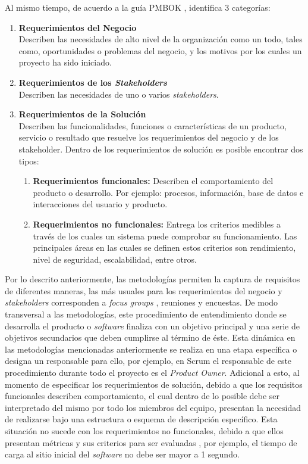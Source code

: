 Al mismo tiempo, de acuerdo a la guía PMBOK \cite{pmbok_guide}, identifica 3 categorías:

\begin{enumerate}
  \item \textbf{Requerimientos del Negocio}\mbox{}\\ Describen las necesidades de alto nivel de la organización como un todo, tales como, oportunidades o problemas del negocio, y los motivos por los cuales un proyecto ha sido iniciado.
  \item \textbf{Requerimientos de los \textit{Stakeholders}}\mbox{}\\ Describen las necesidades de uno o varios \textit{stakeholders}.
  \item \textbf{Requerimientos de la Solución} \mbox{} \\ Describen las funcionalidades, funciones o características de un producto, servicio o resultado que resuelve los requerimientos del negocio y de los stakeholder. Dentro de los requerimientos de solución es posible encontrar dos tipos:
    \begin{enumerate}
      \item \textbf{Requerimientos funcionales:} Describen el comportamiento del producto o desarrollo. Por ejemplo: procesos, información, base de datos e interacciones del usuario y producto.
      \item \textbf{Requerimientos no funcionales:} Entrega los criterios medibles a través de los cuales un sistema puede comprobar su funcionamiento. Las principales áreas en las cuales se definen estos criterios son rendimiento, nivel de seguridad, escalabilidad, entre otros.
    \end{enumerate}
\end{enumerate}

Por lo descrito anteriormente, las metodologías permiten la captura de requisitos de diferentes maneras, las más usuales para los requerimientos del negocio y \textit{stakeholders} corresponden a \textit{focus groups} , reuniones y encuestas. De modo transversal a las metodologías, este procedimiento de entendimiento donde se desarrolla el producto o \textit{software} finaliza con un objetivo principal y una serie de objetivos secundarios que deben cumplirse al término de éste. Esta dinámica en las metodologías mencionadas anteriormente se realiza en una etapa específica o designa un responsable para ello, por ejemplo, en Scrum el responsable de este procedimiento durante todo el proyecto es el \textit{Product Owner}. Adicional a esto, al momento de especificar los requerimientos de solución, debido a que los requisitos funcionales describen comportamiento, el cual dentro de lo posible debe ser interpretado del mismo por todo los miembros del equipo, presentan la necesidad de realizarse bajo una estructura o esquema de descripción específico. Esta situación no sucede con los requerimientos no funcionales, debido a que ellos presentan métricas  y sus criterios para ser evaluadas , por ejemplo, el tiempo de carga al sitio inicial del \textit{software} no debe ser mayor a 1 segundo.

